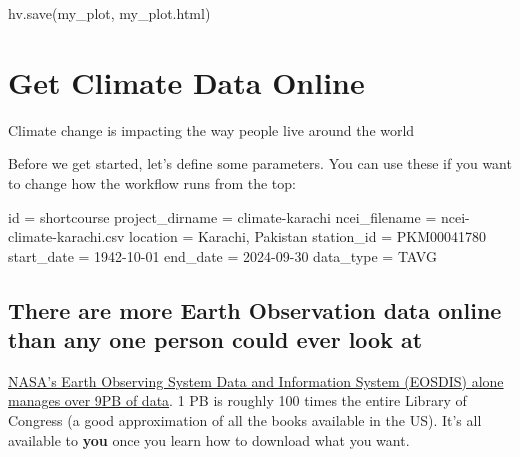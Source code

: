 \documentclass[
  letterpaper,
  DIV=11,
  numbers=noendperiod,
  oneside]{scrreprt}
\newenvironment{Shaded}{\begin{snugshade}}{\end{snugshade}}
\newcommand{\BuiltInTok}[1]{\textcolor[rgb]{0.00,0.23,0.31}{#1}}
\newcommand{\NormalTok}[1]{\textcolor[rgb]{0.00,0.23,0.31}{#1}}
\newcommand{\OperatorTok}[1]{\textcolor[rgb]{0.37,0.37,0.37}{#1}}
\newcommand{\StringTok}[1]{\textcolor[rgb]{0.13,0.47,0.30}{#1}}
\begin{document}
\begin{Shaded}
\begin{Highlighting}[]
\NormalTok{hv.save(my\_plot, }\StringTok{\textquotesingle{}my\_plot.html\textquotesingle{}}\NormalTok{)}
\end{Highlighting}
\end{Shaded}


\chapter{Get Climate Data Online}\label{get-climate-data-online}

Climate change is impacting the way people live around the world

\hfill\break

Before we get started, let's define some parameters. You can use these
if you want to change how the workflow runs from the top:

\begin{Shaded}
\begin{Highlighting}[]
\BuiltInTok{id} \OperatorTok{=} \StringTok{\textquotesingle{}shortcourse\textquotesingle{}}
\NormalTok{project\_dirname }\OperatorTok{=} \StringTok{\textquotesingle{}climate{-}karachi\textquotesingle{}}
\NormalTok{ncei\_filename }\OperatorTok{=} \StringTok{\textquotesingle{}ncei{-}climate{-}karachi.csv\textquotesingle{}}
\NormalTok{location }\OperatorTok{=} \StringTok{\textquotesingle{}Karachi, Pakistan\textquotesingle{}}
\NormalTok{station\_id }\OperatorTok{=} \StringTok{\textquotesingle{}PKM00041780\textquotesingle{}}
\NormalTok{start\_date }\OperatorTok{=} \StringTok{\textquotesingle{}1942{-}10{-}01\textquotesingle{}}
\NormalTok{end\_date }\OperatorTok{=} \StringTok{\textquotesingle{}2024{-}09{-}30\textquotesingle{}}
\NormalTok{data\_type }\OperatorTok{=} \StringTok{\textquotesingle{}TAVG\textquotesingle{}}
\end{Highlighting}
\end{Shaded}

\section{There are more Earth Observation data online than any one
person could ever look
at}\label{there-are-more-earth-observation-data-online-than-any-one-person-could-ever-look-at}

\href{https://www.earthdata.nasa.gov/learn/articles/getting-petabytes-people-how-eosdis-facilitates-earth-observing-data-discovery-and-use}{NASA's
Earth Observing System Data and Information System (EOSDIS) alone
manages over 9PB of data}. 1 PB is roughly 100 times the entire Library
of Congress (a good approximation of all the books available in the US).
It's all available to \textbf{you} once you learn how to download what
you want.
\end{document}
